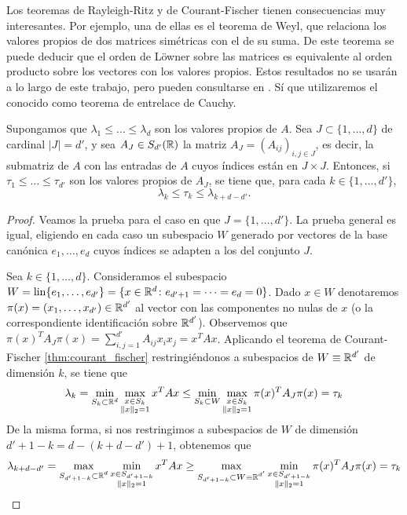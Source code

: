 Los teoremas de Rayleigh-Ritz y de Courant-Fischer tienen consecuencias muy interesantes. Por ejemplo, una de ellas es el teorema de Weyl, que relaciona los valores propios de dos matrices simétricas con el de su suma. De este teorema se puede deducir que el orden de Löwner sobre las matrices es equivalente al orden producto sobre los vectores con los valores propios. Estos resultados no se usarán a lo largo de este trabajo, pero pueden consultarse en \cite{matrix_analysis,zhang2011matrix}. Sí que utilizaremos el conocido como teorema de entrelace de Cauchy.

\begin{thm}
    Supongamos que $\lambda_1 \le \dots \le \lambda_d$ son los valores propios de $A$. Sea $J \subset \{1, \dots, d\}$ de cardinal $|J| = d'$, y sea $A_J \in S_{d'}(\mathbb{R})$ la matriz $A_J = (A_{ij})_{i,j \in J}$, es decir, la submatriz de $A$ con las entradas de $A$ cuyos índices están en $J \times J$. Entonces, si $\tau_1 \le \dots \le \tau_{d'}$ son los valores propios de $A_J$, se tiene que, para cada $k \in \{1,\dots,d'\}$,
    \[ \lambda_k \le \tau_k \le \lambda_{k+d-d'}. \]
\end{thm}

\begin{proof}
    Veamos la prueba para el caso en que $J = \{1,\dots,d'\}$. La prueba general es igual, eligiendo en cada caso un subespacio $W$ generado por vectores de la base canónica $e_1, \dots, e_d$ cuyos índices se adapten a los del conjunto $J$. 

    Sea $k \in \{1,\dots,d\}$. Consideramos el subespacio $W = \operatorname{lin}\{e_1,\dots,e_{d'}\} = \{ x \in \mathbb{R}^d \colon e_{d'+1} = \dots = e_d = 0\}$. Dado $x \in W$ denotaremos $\pi(x) = (x_1,\dots,x_{d'}) \in \mathbb{R}^{d'}$ al vector con las componentes no nulas de $x$ (o la correspondiente identificación sobre $\mathbb{R}^{d'}$). Observemos que $\pi(x)^TA_J\pi(x) = \sum_{i,j=1}^{d'}A_{ij}x_ix_j = x^TAx$. Aplicando el teorema de Courant-Fischer \ref{thm:courant_fischer} restringiéndonos a subespacios de $W \equiv \mathbb{R}^{d'}$ de dimensión $k$, se tiene que
    \[ \lambda_k = \min_{S_k \subset \mathbb{R}^d} \max_{\substack{x \in S_k \\ \|x\|_2 = 1}} x^TAx \le \min_{S_k \subset W} \max_{\substack{x \in S_k \\ \|x\|_2 = 1}} \pi(x)^TA_J\pi(x) = \tau_k  \]
    De la misma forma, si nos restringimos a subespacios de $W$ de dimensión $d' + 1 -k = d - (k+d-d') + 1$, obtenemos que
    \[  \lambda_{k+d-d'} = \max_{\substack{S_{d'+1-k} \subset \mathbb{R}^d}} \min_{\substack{x \in S_{d'+1-k} \\ \|x\|_2 = 1}} x^TAx \ge \max_{\substack{S_{d'+1-k} \subset W \equiv \mathbb{R}^{d'}}} \min_{\substack{x \in S_{d'+1-k} \\ \|x\|_2 = 1}} \pi(x)^TA_J\pi(x) = \tau_k \]
\end{proof}

